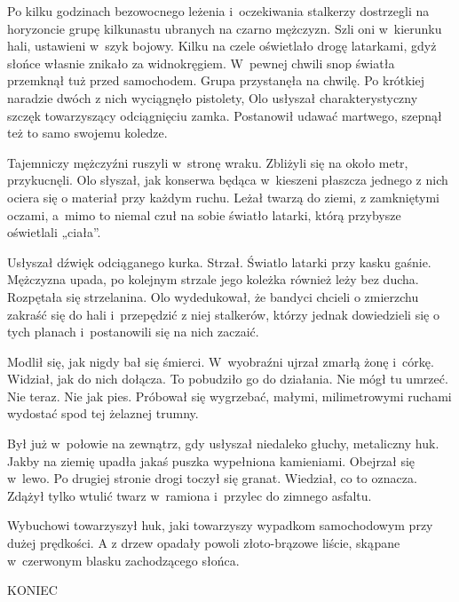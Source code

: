 \documentclass[../MAIN.tex]{subfiles}
\begin{document}
Po kilku godzinach bezowocnego leżenia i~oczekiwania stalkerzy dostrzegli na horyzoncie grupę kilkunastu ubranych na czarno mężczyzn. Szli oni w~kierunku hali, ustawieni w~szyk bojowy. Kilku na czele oświetlało drogę latarkami, gdyż słońce własnie znikało za widnokręgiem. W~pewnej chwili snop światła przemknął tuż przed samochodem. Grupa przystanęła na chwilę. Po krótkiej naradzie dwóch z nich wyciągnęło pistolety, Olo usłyszał charakterystyczny szczęk towarzyszący odciągnięciu zamka. Postanowił udawać martwego, szepnął też to samo swojemu koledze.

Tajemniczy mężczyźni ruszyli w~stronę wraku. Zbliżyli się na około metr, przykucnęli. Olo słyszał, jak konserwa będąca w~kieszeni płaszcza jednego z nich ociera się o materiał przy każdym ruchu. Leżał twarzą do ziemi, z zamkniętymi oczami, a~mimo to niemal czuł na sobie światło latarki, którą przybysze oświetlali „ciała”.

Usłyszał dźwięk odciąganego kurka. Strzał. Światlo latarki przy kasku gaśnie. Mężczyzna upada, po kolejnym strzale jego koleżka również leży bez ducha. Rozpętała się strzelanina. Olo wydedukował, że bandyci chcieli o zmierzchu zakraść się do hali i~przepędzić z niej stalkerów, którzy jednak dowiedzieli się o tych planach i~postanowili się na nich zaczaić.

Modlił się, jak nigdy bał się śmierci. W~wyobraźni ujrzał zmarłą żonę i~córkę. Widział, jak do nich dołącza. To pobudziło go do działania. Nie mógł tu umrzeć. Nie teraz. Nie jak pies. Próbował się wygrzebać, małymi, milimetrowymi ruchami wydostać spod tej żelaznej trumny.

Był już w~połowie na zewnątrz, gdy usłyszał niedaleko głuchy, metaliczny huk. Jakby na ziemię upadła jakaś puszka wypełniona kamieniami. Obejrzał się w~lewo. Po drugiej stronie drogi toczył się granat. Wiedział, co to oznacza. Zdążył tylko wtulić twarz w~ramiona i~przylec do zimnego asfaltu.

Wybuchowi towarzyszył huk, jaki towarzyszy wypadkom samochodowym przy dużej prędkości. A z drzew opadały powoli złoto-brązowe liście, skąpane w~czerwonym blasku zachodzącego słońca.
\begin{center}
KONIEC
\end{center}
\end{document}
